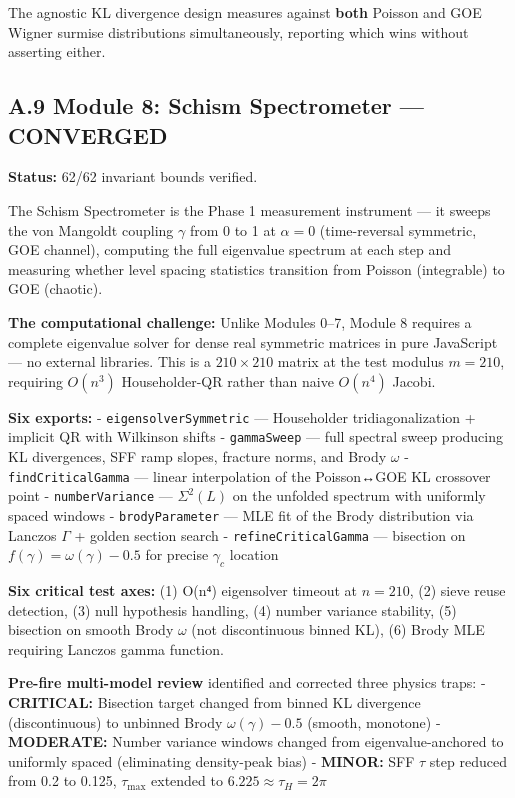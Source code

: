 \documentclass[
  11pt,
]{article}
\numberwithin{equation}{section}
\begin{document}
The agnostic KL divergence design measures against \textbf{both} Poisson
and GOE Wigner surmise distributions simultaneously, reporting which
wins without asserting either.

\subsection{\texorpdfstring{A.9 Module 8: Schism Spectrometer ---
\textbf{CONVERGED}}{A.9 Module 8: Schism Spectrometer --- CONVERGED}}\label{a.9-module-8-schism-spectrometer-converged}

\textbf{Status:} 62/62 invariant bounds verified.

The Schism Spectrometer is the Phase 1 measurement instrument --- it
sweeps the von Mangoldt coupling \(\gamma\) from 0 to 1 at
\(\alpha = 0\) (time-reversal symmetric, GOE channel), computing the
full eigenvalue spectrum at each step and measuring whether level
spacing statistics transition from Poisson (integrable) to GOE
(chaotic).

\textbf{The computational challenge:} Unlike Modules 0--7, Module 8
requires a complete eigenvalue solver for dense real symmetric matrices
in pure JavaScript --- no external libraries. This is a
\(210 \times 210\) matrix at the test modulus \(m = 210\), requiring
\(O(n^3)\) Householder-QR rather than naive \(O(n^4)\) Jacobi.

\textbf{Six exports:} - \texttt{eigensolverSymmetric} --- Householder
tridiagonalization + implicit QR with Wilkinson shifts -
\texttt{gammaSweep} --- full spectral sweep producing KL divergences,
SFF ramp slopes, fracture norms, and Brody \(\omega\) -
\texttt{findCriticalGamma} --- linear interpolation of the Poisson↔GOE
KL crossover point - \texttt{numberVariance} --- \(\Sigma^2(L)\) on the
unfolded spectrum with uniformly spaced windows -
\texttt{brodyParameter} --- MLE fit of the Brody distribution via
Lanczos \(\Gamma\) + golden section search -
\texttt{refineCriticalGamma} --- bisection on
\(f(\gamma) = \omega(\gamma) - 0.5\) for precise \(\gamma_c\) location

\textbf{Six critical test axes:} (1) O(n⁴) eigensolver timeout at
\(n = 210\), (2) sieve reuse detection, (3) null hypothesis handling,
(4) number variance stability, (5) bisection on smooth Brody \(\omega\)
(not discontinuous binned KL), (6) Brody MLE requiring Lanczos gamma
function.

\textbf{Pre-fire multi-model review} identified and corrected three
physics traps: - \textbf{CRITICAL:} Bisection target changed from binned
KL divergence (discontinuous) to unbinned Brody \(\omega(\gamma) - 0.5\)
(smooth, monotone) - \textbf{MODERATE:} Number variance windows changed
from eigenvalue-anchored to uniformly spaced (eliminating density-peak
bias) - \textbf{MINOR:} SFF \(\tau\) step reduced from 0.2 to 0.125,
\(\tau_{\max}\) extended to \(6.225 \approx \tau_H = 2\pi\)
\end{document}
